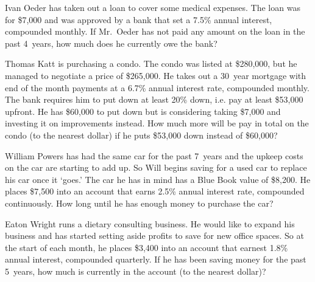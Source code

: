 \documentclass[12pt,letterpaper]{exam}
\begin{document}
\begin{questions}
\newpage
\question[10] Ivan Oeder has taken out a loan to cover some medical expenses. The loan was for \$7,000 and was approved by a bank that set a 7.5\% annual interest, compounded monthly. If Mr.~Oeder has not paid any amount on the loan in the past 4~years, how much does he currently owe the bank?



\newpage
\question[10] Thomas Katt is purchasing a condo. The condo was listed at \$280,000, but he managed to negotiate a price of \$265,000. He takes out a 30~year mortgage with end of the month payments at a 6.7\% annual interest rate, compounded monthly. The bank requires him to put down at least 20\% down, i.e. pay at least \$53,000 upfront. He has \$60,000 to put down but is considering taking \$7,000 and investing it on improvements instead. How much more will be pay in total on the condo (to the nearest dollar) if he puts \$53,000 down instead of \$60,000?



\newpage
\question[10] William Powers has had the same car for the past 7~years and the upkeep costs on the car are starting to add up. So Will begins saving for a used car to replace his car once it `goes.' The car he has in mind has a Blue Book value of \$8,200. He places \$7,500 into an account that earns 2.5\% annual interest rate, compounded continuously. How long until he has enough money to purchase the car?



\newpage
\question[10] Eaton Wright runs a dietary consulting business. He would like to expand his business and has started setting aside profits to save for new office spaces. So at the start of each month, he places \$3,400 into an account that earnest 1.8\% annual interest, compounded quarterly. If he has been saving money for the past 5~years, how much is currently in the account (to the nearest dollar)?


\end{questions}
\end{document}
